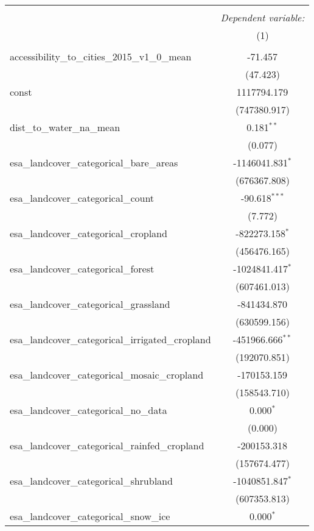 \begin{table}[!htbp] \centering
\begin{tabular}{@{\extracolsep{5pt}}lc}
\\[-1.8ex]\hline
\hline \\[-1.8ex]
& \multicolumn{1}{c}{\textit{Dependent variable:}} \
\cr \cline{1-2}
\\[-1.8ex] & (1) \\
\hline \\[-1.8ex]
 accessibility_to_cities_2015_v1_0_mean & -71.457$^{}$ \\
  & (47.423) \\
 const & 1117794.179$^{}$ \\
  & (747380.917) \\
 dist_to_water_na_mean & 0.181$^{**}$ \\
  & (0.077) \\
 esa_landcover_categorical_bare_areas & -1146041.831$^{*}$ \\
  & (676367.808) \\
 esa_landcover_categorical_count & -90.618$^{***}$ \\
  & (7.772) \\
 esa_landcover_categorical_cropland & -822273.158$^{*}$ \\
  & (456476.165) \\
 esa_landcover_categorical_forest & -1024841.417$^{*}$ \\
  & (607461.013) \\
 esa_landcover_categorical_grassland & -841434.870$^{}$ \\
  & (630599.156) \\
 esa_landcover_categorical_irrigated_cropland & -451966.666$^{**}$ \\
  & (192070.851) \\
 esa_landcover_categorical_mosaic_cropland & -170153.159$^{}$ \\
  & (158543.710) \\
 esa_landcover_categorical_no_data & 0.000$^{*}$ \\
  & (0.000) \\
 esa_landcover_categorical_rainfed_cropland & -200153.318$^{}$ \\
  & (157674.477) \\
 esa_landcover_categorical_shrubland & -1040851.847$^{*}$ \\
  & (607353.813) \\
 esa_landcover_categorical_snow_ice & 0.000$^{*}$ \\

\end{tabular}
\end{table}
